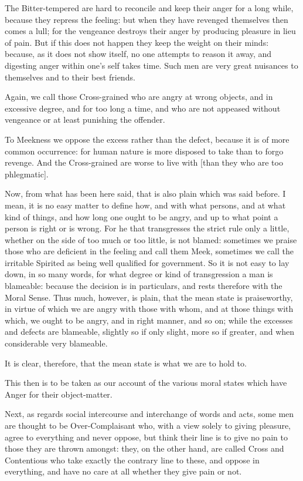 The Bitter-tempered are hard to reconcile and keep their anger for a long
while, because they repress the feeling: but when they have revenged themselves
then comes a lull; for the vengeance destroys their anger by producing pleasure
in lieu of pain. But if this does not happen they keep the weight on their
minds: because, as it does not show itself, no one attempts to reason it away,
and digesting anger within one’s self takes time. Such men are very great
nuisances to themselves and to their best friends.

Again, we call those Cross-grained who are angry at wrong objects, and in
excessive degree, and for too long a time, and who are not appeased without
vengeance or at least punishing the offender.

To Meekness we oppose the excess rather than the defect, because it is of more
common occurrence: for human nature is more disposed to take than to forgo
revenge. And the Cross-grained are worse to live with [than they who are too
phlegmatic].

Now, from what has been here said, that is also plain which was said before. I
mean, it is no easy matter to define how, and with what persons, and at what
kind of things, and how long one ought to be angry, and up to what point a
person is right or is wrong. For he that transgresses the strict rule only a
little, whether on the side of too much or too little, is not blamed: sometimes
we praise those who are deficient in the feeling and call them Meek, sometimes
we call the irritable Spirited as being well qualified for government. So it is
not easy to lay down, in so many words, for what degree or kind of
transgression a man is blameable: because the decision is in particulars, and
rests therefore with the Moral Sense. Thus much, however, is plain, that the
mean state is praiseworthy, in virtue of which we are angry with those with
whom, and at those things with which, we ought to be angry, and in right
manner, and so on; while the excesses and defects are blameable, slightly so if
only slight, more so if greater, and when considerable very blameable.

It is clear, therefore, that the mean state is what we are to hold to.

This then is to be taken as our account of the various moral states which have
Anger for their object-matter.


Next, as regards social intercourse and interchange of words and acts, some men
are thought to be Over-Complaisant who, with a view solely to giving pleasure,
agree to everything and never oppose, but think their line is to give no pain
to those they are thrown amongst: they, on the other hand, are called Cross and
Contentious who take exactly the contrary line to these, and oppose in
everything, and have no care at all whether they give pain or not.

